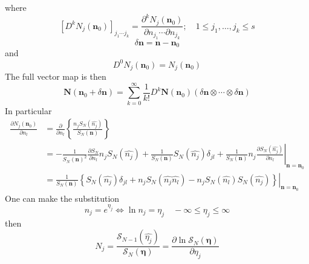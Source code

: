 \documentclass[aps,preprint]{revtex4}%
\begin{document}
where
\begin{equation}
\left[  D^{k}N_{j}\left(  \mathbf{n}_{0}\right)  \right]  _{j_{1}\cdots j_{k}%
}=\frac{\partial^{k}N_{j}\left(  \mathbf{n}_{0}\right)  }{\partial n_{j_{1}%
}\cdots\partial n_{j_{k}}};\quad1\leq j_{1},\ldots,j_{k}\leq s
\end{equation}%
\begin{equation}
\delta\mathbf{n}=\mathbf{n}-\mathbf{n}_{0}%
\end{equation}
and
\begin{equation}
D^{0}N_{j}\left(  \mathbf{n}_{0}\right)  =N_{j}\left(  \mathbf{n}_{0}\right)
\end{equation}
The full vector map is then
\begin{equation}
\mathbf{N}\left(  \mathbf{n}_{0}+\delta\mathbf{n}\right)  =\sum_{k=0}^{\infty
}\frac{1}{k!}D^{k}\mathbf{N}\left(  \mathbf{n}_{0}\right)  \left(
\delta\mathbf{n}\otimes\cdots\otimes\delta\mathbf{n}\right)
\end{equation}
In particular
\begin{align}
\frac{\partial N_{j}\left(  \mathbf{n}_{0}\right)  }{\partial n_{l}}  &
=\frac{\partial}{\partial n_{l}}\left\{  \frac{n_{j}S_{N}\left(
\widehat{n_{j}}\right)  }{S_{N}\left(  \mathbf{n}\right)  }\right\}
\nonumber\\
&  =\left.  -\frac{1}{S_{N}\left(  \mathbf{n}\right)  ^{2}}\frac{\partial
S_{N}}{\partial n_{l}}n_{j}S_{N}\left(  \widehat{n_{j}}\right)  +\frac
{1}{S_{N}\left(  \mathbf{n}\right)  }S_{N}\left(  \widehat{n_{j}}\right)
\delta_{jl}+\frac{1}{S_{N}\left(  \mathbf{n}\right)  }n_{j}\frac{\partial
S_{N}\left(  \widehat{n_{j}}\right)  }{\partial n_{l}}\right\vert
_{\mathbf{n=n}_{0}}\nonumber\\
&  =\left.  \frac{1}{S_{N}\left(  \mathbf{n}\right)  }\left\{  S_{N}\left(
\widehat{n_{j}}\right)  \delta_{jl}+n_{j}S_{N}\left(  \widehat{n_{j}}%
\widehat{n_{l}}\right)  -n_{j}S_{N}\left(  \widehat{n_{l}}\right)
S_{N}\left(  \widehat{n_{j}}\right)  \right\}  \right\vert _{\mathbf{n=n}_{0}}%
\end{align}
One can make the substitution
\begin{equation}
n_{j}=e^{\eta_{j}}\Leftrightarrow\ln n_{j}=\eta_{j}\quad-\infty\leq\eta
_{j}\leq\infty
\end{equation}
then
\begin{equation}
N_{j}=\frac{\mathcal{S}_{N-1}\left(  \widehat{\eta_{j}}\right)  }%
{\mathcal{S}_{N}\left(  \mathbf{\eta}\right)  }=\frac{\partial\ln
\mathcal{S}_{N}\left(  \mathbf{\eta}\right)  }{\partial\eta_{j}}%
\end{equation}
\end{document}
